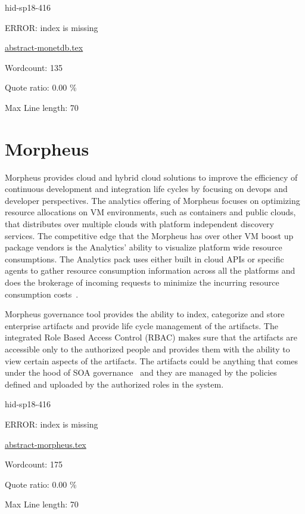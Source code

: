 \begin{IU}

hid-sp18-416

ERROR: index is missing

\href{https://github.com/cloudmesh-community/hid-sp18-416/blob/master//technology/abstract-monetdb.tex}{abstract-monetdb.tex}

 

Wordcount: 135


Quote ratio: 0.00 \%
 
Max Line length: 70
\end{IU}

\section{Morpheus}

Morpheus provides cloud and hybrid cloud solutions to improve the
efficiency of continuous development and integration life cycles by
focusing on devops and developer perspectives. The analytics offering
of Morpheus focuses on optimizing resource allocations on VM
environments, such as containers and public clouds, that distributes
over multiple clouds with platform independent discovery services. The
competitive edge that the Morpheus has over other VM boost up package
vendors is the Analytics’ ability to visualize platform wide resource
consumptions. The Analytics pack uses either built in cloud APIs or
specific agents to gather resource consumption information across all
the platforms and does the brokerage of incoming requests to minimize
the incurring resource consumption
costs~\cite{hid-sp18-416-www-morpheus-product-guide}.

Morpheus governance tool provides the ability to index, categorize and
store enterprise artifacts and provide life cycle management of the
artifacts. The integrated Role Based Access Control (RBAC) makes sure
that the artifacts are accessible only to the authorized people and
provides them with the ability to view certain aspects of the
artifacts. The artifacts could be anything that comes under the hood
of SOA governance~\cite{hid-sp18-416-www-soa-governance-wikipedia} and
they are managed by the policies defined and uploaded by the
authorized roles in the system.


\begin{IU}

hid-sp18-416

ERROR: index is missing

\href{https://github.com/cloudmesh-community/hid-sp18-416/blob/master//technology/abstract-morpheus.tex}{abstract-morpheus.tex}

 

Wordcount: 175


Quote ratio: 0.00 \%
 
Max Line length: 70
\end{IU}

